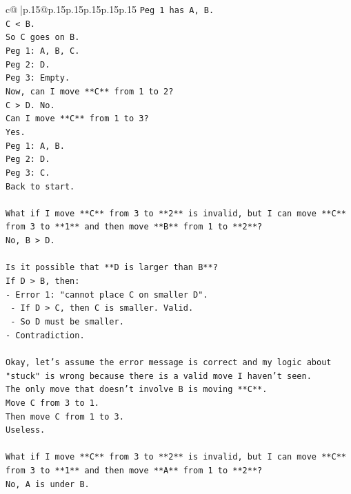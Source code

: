 \documentclass{article}
\begin{document}
{\begin{supertabular}{c@{$\;$}|p{.15\linewidth}@{}p{.15\linewidth}p{.15\linewidth}p{.15\linewidth}p{.15\linewidth}p{.15\linewidth}}
{{{\texttt{Peg 1 has A, B.} \\
\texttt{C < B.} \\
\texttt{So C goes on B.} \\
\texttt{Peg 1: A, B, C.} \\
\texttt{Peg 2: D.} \\
\texttt{Peg 3: Empty.} \\
\texttt{Now, can I move **C** from 1 to 2?} \\
\texttt{C > D. No.} \\
\texttt{Can I move **C** from 1 to 3?} \\
\texttt{Yes.} \\
\texttt{Peg 1: A, B.} \\
\texttt{Peg 2: D.} \\
\texttt{Peg 3: C.} \\
\texttt{Back to start.} \\
\\ 
\texttt{What if I move **C** from 3 to **2** is invalid, but I can move **C** from 3 to **1** and then move **B** from 1 to **2**?} \\
\texttt{No, B > D.} \\
\\ 
\texttt{Is it possible that **D is larger than B**?} \\
\texttt{If D > B, then:} \\
\texttt{{-} Error 1: "cannot place C on smaller D".} \\
\texttt{    {-} If D > C, then C is smaller. Valid.} \\
\texttt{    {-} So D must be smaller.} \\
\texttt{{-} Contradiction.} \\
\\ 
\texttt{Okay, let's assume the error message is correct and my logic about "stuck" is wrong because there is a valid move I haven't seen.} \\
\texttt{The only move that doesn't involve B is moving **C**.} \\
\texttt{Move C from 3 to 1.} \\
\texttt{Then move C from 1 to 3.} \\
\texttt{Useless.} \\
\\ 
\texttt{What if I move **C** from 3 to **2** is invalid, but I can move **C** from 3 to **1** and then move **A** from 1 to **2**?} \\
\texttt{No, A is under B.} \\
}}}
\end{supertabular}}
\end{document}
